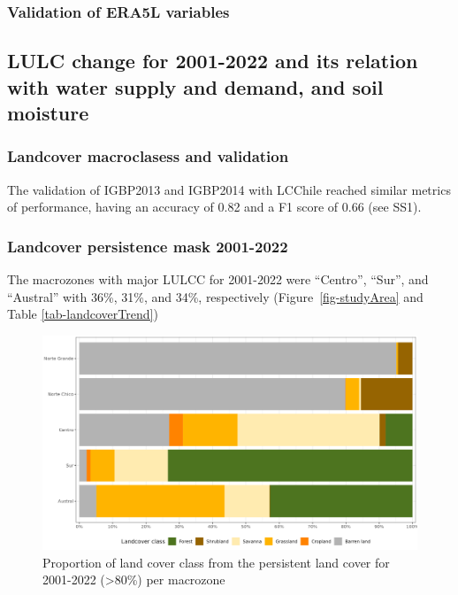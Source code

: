 \documentclass[
  authoryear,
  preprint,
  3p,
  onecolumn]{elsarticle}
\begin{document}
\hypertarget{validation-of-era5l-variables-1}{%
\subsubsection{Validation of ERA5L
variables}\label{validation-of-era5l-variables-1}}

\hypertarget{lulc-change-for-2001-2022-and-its-relation-with-water-supply-and-demand-and-soil-moisture}{%
\subsection{LULC change for 2001-2022 and its relation with water supply
and demand, and soil
moisture}\label{lulc-change-for-2001-2022-and-its-relation-with-water-supply-and-demand-and-soil-moisture}}

\hypertarget{landcover-macroclasess-and-validation-1}{%
\subsubsection{Landcover macroclasess and
validation}\label{landcover-macroclasess-and-validation-1}}

The validation of IGBP2013 and IGBP2014 with LCChile reached similar
metrics of performance, having an accuracy of 0.82 and a F1 score of
0.66 (see SS1).

\hypertarget{landcover-persistence-mask-2001-2022-1}{%
\subsubsection{Landcover persistence mask
2001-2022}\label{landcover-persistence-mask-2001-2022-1}}

The macrozones with major LULCC for 2001-2022 were ``Centro'', ``Sur'',
and ``Austral'' with 36\%, 31\%, and 34\%, respectively
(Figure~\ref{fig-studyArea} and Table \ref{tab-landcoverTrend})

\begin{figure}[!ht]

{\centering \includegraphics{../output/figs/LC_pers80_per_macrozone.png}

}

\caption{\label{fig-LCprop}Proportion of land cover class from the
persistent land cover for 2001-2022 (\textgreater80\%) per macrozone}

\end{figure}
\end{document}
